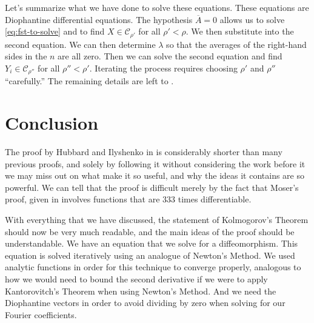 \documentclass[twoside,letterpaper,11pt]{article}
\numberwithin{equation}{section}
\begin{document}
Let's summarize what we have done to solve these equations.
These equations are Diophantine differential equations.
The hypothesis $\overline{A} = 0$ allows us to solve \cref{eq:fst-to-solve} and
to find $X \in \mathcal{C}_{\rho'}$ for all $\rho' < \rho$.
We then substitute into the second equation.
We can then determine $\lambda$ so that the averages of the right-hand sides in
the $n$ are all zero.
Then we can solve the second equation and find $Y_i \in \mathcal{C}_{\rho''}$
for all $\rho'' < \rho'$.
Iterating the process requires choosing $\rho'$ and $\rho''$ ``carefully.''
The remaining details are left to \cite{hi02}.

\section{Conclusion}
\label{sec:conclusion}

The proof by Hubbard and Ilyshenko in \cite{hi02} is considerably shorter than
many previous proofs, and solely by following it without considering the work
before it we may miss out on what make it so useful, and why the ideas it
contains are so powerful.
We can tell that the proof is difficult merely by the fact that Moser's proof,
given in %
involves functions that are $333$ times differentiable.

With everything that we have discussed, the statement of Kolmogorov's Theorem
should now be very much readable, and the main ideas of the proof should be
understandable.
We have an equation that we solve for a diffeomorphism.
This equation is solved iteratively using an analogue of Newton's Method.
We used analytic functions in order for this technique to converge properly,
analogous to how we would need to bound the second derivative if we were to
apply Kantorovitch's Theorem when using Newton's Method.
And we need the Diophantine vectors in order to avoid dividing by zero when
solving for our Fourier coefficients.


\nocite{*}


\end{document}

